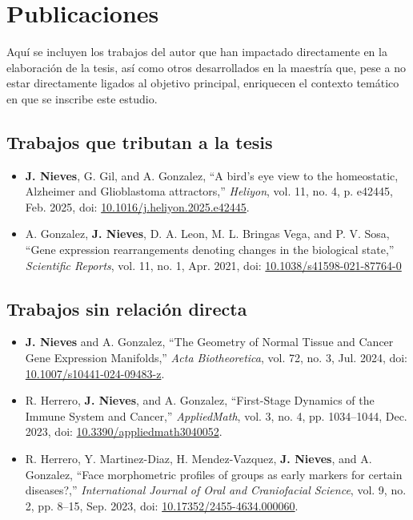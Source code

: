 \section*{Publicaciones}

Aquí se incluyen los trabajos del autor que han impactado directamente en la elaboración de la tesis, así como otros desarrollados en la maestría que, pese a no estar directamente ligados al objetivo principal, enriquecen el contexto temático en que se inscribe este estudio.


\subsection*{Trabajos que tributan a la tesis}

\begin{itemize}
	\item \textbf{J. Nieves}, G. Gil, and A. Gonzalez, ``A bird's eye view to the homeostatic, Alzheimer and Glioblastoma attractors,'' \textit{Heliyon}, vol. 11, no. 4, p. e42445, Feb. 2025, doi: \href{https://doi.org/10.1016/j.heliyon.2025.e42445}{10.1016/j.heliyon.2025.e42445}.
	
	\item A. Gonzalez, \textbf{J. Nieves}, D. A. Leon, M. L. Bringas Vega, and P. V. Sosa, ``Gene expression rearrangements denoting changes in the biological state,'' \textit{Scientific Reports}, vol. 11, no. 1, Apr. 2021, doi: \href{https://doi.org/10.1038/s41598-021-87764-0}{10.1038/s41598-021-87764-0}
\end{itemize}

\subsection*{Trabajos sin relación directa}

\begin{itemize}
	\item \textbf{J. Nieves} and A. Gonzalez, ``The Geometry of Normal Tissue and Cancer Gene Expression Manifolds,'' \textit{Acta Biotheoretica}, vol. 72, no. 3, Jul. 2024, doi: \href{https://doi.org/10.1007/s10441-024-09483-z}{10.1007/s10441-024-09483-z}.
	
	\item R. Herrero, \textbf{J. Nieves}, and A. Gonzalez, ``First-Stage Dynamics of the Immune System and Cancer,'' \textit{AppliedMath}, vol. 3, no. 4, pp. 1034–1044, Dec. 2023, doi: \href{https://doi.org/10.3390/appliedmath3040052}{10.3390/appliedmath3040052}.
	
	\item R. Herrero, Y. Martinez-Diaz, H. Mendez-Vazquez, \textbf{J. Nieves}, and A. Gonzalez, ``Face morphometric profiles of groups as early markers for certain diseases?,'' \textit{International Journal of Oral and Craniofacial Science}, vol. 9, no. 2, pp. 8–15, Sep. 2023, doi: \href{https://doi.org/10.17352/2455-4634.000060}{10.17352/2455-4634.000060}.
\end{itemize}

